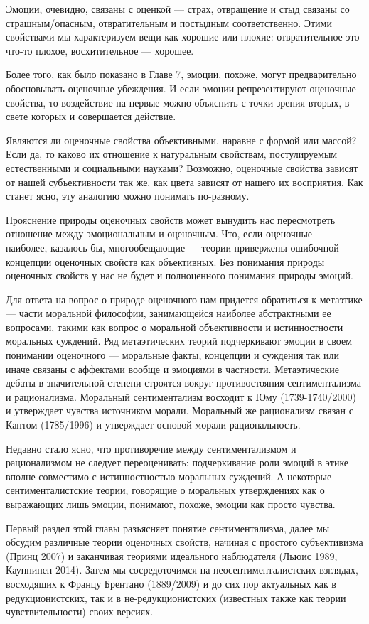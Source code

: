 \documentclass[11pt]{book}
\begin{document}
Эмоции, очевидно, связаны с оценкой --- страх, отвращение и стыд связаны со страшным/опасным, отвратительным и постыдным соответственно. Этими свойствами мы характеризуем вещи как хорошие или плохие: отвратительное это что-то плохое, восхитительное --- хорошее.

Более того, как было показано в Главе 7, эмоции, похоже, могут предварительно обосновывать оценочные убеждения. И если эмоции репрезентируют оценочные свойства, то воздействие на первые можно объяснить с точки зрения вторых, в свете которых и совершается действие.

Являются ли оценочные свойства объективными, наравне с формой или массой? Если да, то каково их отношение к натуральным свойствам, постулируемым естественными и социальными науками? Возможно, оценочные свойства зависят от нашей субъективности так же, как цвета зависят от нашего их восприятия. Как станет ясно, эту аналогию можно понимать по-разному.

Прояснение природы оценочных свойств может вынудить нас пересмотреть отношение между эмоциональным и оценочным. Что, если оценочные --- наиболее, казалось бы, многообещающие --- теории привержены ошибочной концепции оценочных свойств как объективных. Без понимания природы оценочных свойств у нас не будет и полноценного понимания природы эмоций.

Для ответа на вопрос о природе оценочного нам придется обратиться к метаэтике --- части моральной философии, занимающейся наиболее абстрактными ее вопросами, такими как вопрос о моральной объективности и истинностности моральных суждений. Ряд метаэтических теорий подчеркивают эмоции в своем понимании оценочного --- моральные факты, концепции и суждения так или иначе связаны с аффектами вообще и эмоциями в частности. Метаэтические дебаты в значительной степени строятся вокруг противостояния сентиментализма и рационализма. Моральный сентиментализм восходит к Юму (1739-1740/2000) и утверждает чувства источником морали. Моральный же рационализм связан с Кантом (1785/1996) и утверждает основой морали рациональность.

Недавно стало ясно, что противоречие между сентиментализмом и рационализмом не следует переоценивать: подчеркивание роли эмоций в этике вполне совместимо с истинностностью моральных суждений. А некоторые сентименталистские теории, говорящие о моральных утверждениях как о выражающих лишь эмоции, понимают, похоже, эмоции как просто чувства.

Первый раздел этой главы разъясняет понятие сентиментализма, далее мы обсудим различные теории оценочных свойств, начиная с простого субъективизма (Принц 2007) и заканчивая теориями идеального наблюдателя (Льюис 1989, Кауппинен 2014). Затем мы сосредоточимся на неосентименталистских взглядах, восходящих к Францу Брентано (1889/2009) и до сих пор актуальных как в редукционистских, так и в не-редукционистских (известных также как теории чувствительности) своих версиях.
\end{document}
